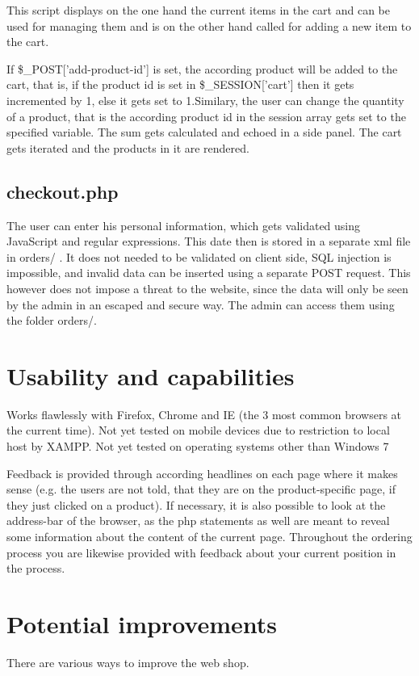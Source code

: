 \documentclass{scrartcl}
\begin{document}
This script displays on the one hand the current items in the cart and can be used for managing them and is on the other hand called for adding a new item to the cart. 

If \$\_POST['add-product-id'] is set, the according product will be added to the cart, that is, if the product id is set in \$\_SESSION['cart'] then it gets incremented by 1, else it gets set to 1.Similary, the user can change the quantity of a product, that is the according product id in the session array gets set to the specified variable. 
The sum gets calculated and echoed in a side panel. The cart gets iterated and the products in it are rendered. 

\subsection{checkout.php}
The user can enter his personal information, which gets validated using JavaScript and regular expressions. This date then is stored in a separate xml file in orders/ . It does not needed to be validated on client side, SQL injection is impossible, and invalid data can be inserted using a separate POST request. This however does not impose a threat to the website, since the data will only be seen by the admin in an escaped and secure way. The admin can access them using the folder orders/. 

\section{Usability and capabilities}
Works flawlessly with Firefox, Chrome and IE (the 3 most common browsers at the current time). Not yet tested on mobile devices due to 
restriction to local host by XAMPP. Not yet tested on operating systems other than Windows 7

Feedback is provided through according headlines on each page where it makes sense (e.g. the users are not told, that they are on the product-specific page, if they just clicked on a product). If necessary, it is also possible to look at the address-bar of the browser, as the php statements as well are meant to reveal some information about the content of the current page.
Throughout the ordering process you are likewise provided with feedback about your current position in the process.

\section{Potential improvements}
There are various ways to improve the web shop.
\end{document}
